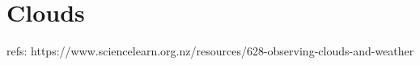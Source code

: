 \section{Clouds}

refs: 
https://www.sciencelearn.org.nz/resources/628-observing-clouds-and-weather
